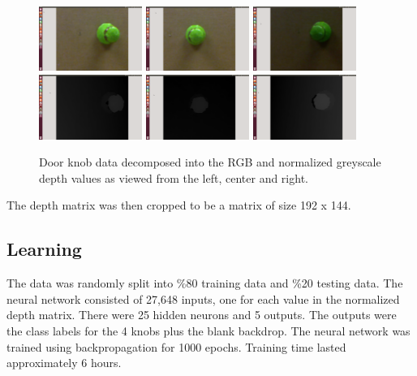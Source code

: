 \documentclass{article}
\begin{document}
\begin{figure}
    \centering
    \includegraphics[width=0.3\textwidth]{DH_RGB_L.png}
    \includegraphics[width=0.3\textwidth]{DH_RGB_C.png}
    \includegraphics[width=0.3\textwidth]{DH_RGB_R.png}
    \includegraphics[width=0.3\textwidth]{DH_D_L.png}
    \includegraphics[width=0.3\textwidth]{DH_D_C.png}
    \includegraphics[width=0.3\textwidth]{DH_D_R.png}
    \caption{Door knob data decomposed into the RGB and normalized greyscale depth values as viewed from the left, center and right.}
    \label{fig:decomposition}
\end{figure}



The depth matrix was then cropped to be a matrix of size 192 x 144.

\subsection{Learning}
The data was randomly split into \%80 training data and \%20 testing data. The neural network consisted of 27,648 inputs, one for each value in the normalized depth matrix.  There were 25 hidden neurons and 5 outputs. The outputs were the class labels for the 4 knobs plus the blank backdrop.  The neural network was trained using backpropagation for 1000 epochs. Training time lasted approximately 6 hours.
\end{document}
